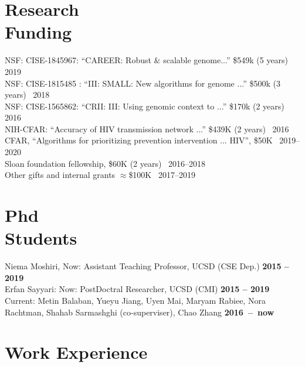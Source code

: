 \documentclass[margin,line,letterpaper]{resume}
\begin{document}
\begin{resume}
    \section{\mysidestyle Research\\Funding}
      NSF: CISE-1845967:  ``CAREER: Robust \& scalable genome...''
 \$549k (5 years)~
 \hfill 2019\\
      NSF: CISE-1815485 :  ``III: SMALL: New algorithms for genome ...''
 \$500k (3 years)~
 \hfill 2018\\
 NSF: CISE-1565862:  ``CRII: III: Using genomic context to ...''
 \$170k (2 years)~
 \hfill 2016\\
 NIH-CFAR:  ``Accuracy of HIV transmission network ...''
 \$439K (2 years)~
 \hfill 2016\\
 CFAR, ``Algorithms for prioritizing prevention intervention ... HIV'', \$50K \hfill  ~2019--2020\\
  Sloan foundation fellowship, \$60K (2 years) \hfill  ~2016--2018\\
 Other gifts and internal grants $\approx$\$100K  \hfill  ~2017--2019



\section{\mysidestyle Phd \\Students}
    Niema Moshiri, Now: Assistant Teaching Professor, UCSD (CSE Dep.)
 \hfill \textbf{2015 -- 2019}\\
     Erfan Sayyari:  Now: PostDoctral Researcher, UCSD (CMI)
 \hfill \textbf{2015 -- 2019}\\
Current: Metin Balaban, Yueyu Jiang, Uyen Mai, Maryam Rabiee, Nora Rachtman, Shahab Sarmashghi (co-superviser), Chao Zhang \hfill \textbf{2016~--~now}



    \section{\mysidestyle Work Experience}


\end{resume}
\end{document}
